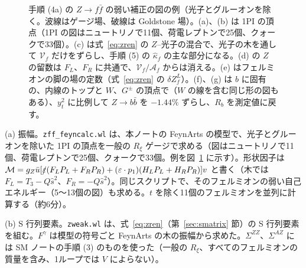 \documentclass[a4paper,10pt]{ltjsarticle}
\begin{document}
\begin{figure}[tbp]
\caption{手順 (4a) の $Z\to f\bar f$ の弱い補正の図の例（光子とグルーオンを除く。波線はゲージ場、破線は Goldstone 場）。(a)、(b) は 1PI の頂点（1PI の図はニュートリノで11個、荷電レプトンで25個、クォークで33個）。(c) は式~\eqref{eq:zren} の $Z$--光子の混合で、光子の木を通して $\mathcal V_f$ だけをずらし、手順 (5) の $\hat\kappa_f$ の主な部分になる。(d) の $Z$ の留数は $F_L$、$F_R$ に共通で、$\mathcal V_f/\mathcal A_f$ からは消える。(e) はフェルミオンの脚の場の定数（式~\eqref{eq:zren} の $\delta Z_f^L$）。(f)、(g) は $b$ に固有の、内線のトップと $W$、$G^\pm$ の頂点で（$W$ の線を含む同じ形の図もある）、$y_t^2$ に比例して $Z\to b\bar b$ を $-1.44\%$ ずらし、$R_b$ を測定値に戻す。}
\label{fig:znlo}
\end{figure}

(a) 振幅。\texttt{zff\_feyncalc.wl} は、本ノートの FeynArts の模型で、光子とグルーオンを除いた 1PI の頂点を一般の $R_\xi$ ゲージで求める（図はニュートリノで11個、荷電レプトンで25個、クォークで33個。例を図~\ref{fig:znlo} に示す）。形状因子は $\mathcal M=g_Z\bar u[\slashed\varepsilon(F_LP_L+F_RP_R)+(\varepsilon\cdot p_1)(H_LP_L+H_RP_R)]v$ と書く（木では $F_L=T_3-Q\hat s^2$、$F_R=-Q\hat s^2$）。同じスクリプトで、そのフェルミオンの弱い自己エネルギー（5〜13個の図）も求める。$t$ を除く11個のフェルミオンを並列に計算する（約6分）。

(b) S 行列要素。\texttt{zweak.wl} は、式~\eqref{eq:zren}（第~\ref{sec:smatrix} 節）の S 行列要素を組む。$F^\gamma$ は模型の符号ごと FeynArts の木の振幅から求めた。$\Sigma^{ZZ}$、$\Sigma^{AZ}$ には SM ノートの手順 (3) のものを使った（一般の $R_\xi$、すべてのフェルミオンの質量を含み、1ループでは $V$ によらない）。
\end{document}
